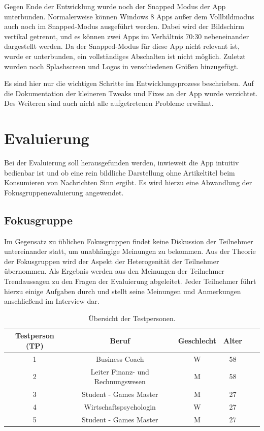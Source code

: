 \documentclass[12pt,a4paper,bibtotoc,abstracton]{scrartcl}
\begin{document}
Gegen Ende der Entwicklung wurde noch der Snapped Modus der App unterbunden. Normalerweise können Windows 8 Apps außer dem Vollbildmodus auch noch im Snapped-Modus ausgeführt werden. Dabei wird der Bildschirm vertikal getrennt, und es können zwei Apps im Verhältnis 70:30 nebeneinander dargestellt werden. Da der Snapped-Modus für diese App nicht relevant ist, wurde er unterbunden, ein vollständiges Abschalten ist nicht möglich. Zuletzt wurden noch Splashscreen und Logos in verschiedenen Größen hinzugefügt.

Es sind hier nur die wichtigen Schritte im Entwicklungsprozess beschrieben. Auf die Dokumentation der kleineren Tweaks und Fixes an der App wurde verzichtet. Des Weiteren sind auch nicht alle aufgetretenen Probleme erwähnt. 

\newpage
\section{Evaluierung} 
\label{sec:evaluierung}
Bei der Evaluierung soll herausgefunden werden, inwieweit die App intuitiv bedienbar ist und ob eine rein bildliche Darstellung ohne Artikeltitel beim Konsumieren von Nachrichten Sinn ergibt. Es wird hierzu eine Abwandlung der Fokusgruppenevaluierung angewendet. 

\subsection{Fokusgruppe}
\label{subsec:fokusgruppe}
Im Gegensatz zu üblichen Fokusgruppen findet keine Diskussion der Teilnehmer untereinander statt, um unabhängige Meinungen zu bekommen. Aus der Theorie der Fokusgruppen wird der Aspekt der Heterogenität der Teilnehmer übernommen. Als Ergebnis werden aus den Meinungen der Teilnehmer Trendaussagen zu den Fragen der Evaluierung abgeleitet. Jeder Teilnehmer führt hierzu einige Aufgaben durch und stellt seine Meinungen und Anmerkungen anschließend im Interview dar.

\begin{table}[h]
\centering
\begin{tabular}{|c|c|c|c|c|c|}
\hline 
\rule[-1ex]{0pt}{3.5ex} \textbf{Testperson (TP)} & \textbf{Beruf} & \textbf{Geschlecht} & \textbf{Alter} \\ 
\hline 
\rule[-1ex]{0pt}{2.5ex} 1 & Business Coach & W & 58 \\ 
\hline 
\rule[-1ex]{0pt}{2.5ex} 2 & Leiter Finanz- und Rechnungswesen & M & 58 \\ 
\hline 
\rule[-1ex]{0pt}{2.5ex} 3 & Student - Games Master & M & 27  \\ 
\hline 
\rule[-1ex]{0pt}{2.5ex} 4 & Wirtschaftspsychologin & W & 27 \\ 
\hline 
\rule[-1ex]{0pt}{2.5ex} 5 & Student - Games Master & M & 27 \\ 
\hline 
\end{tabular} 
\caption{Übersicht der Testpersonen.}
\label{tab:testpersonen}
\end{table}
\end{document}

